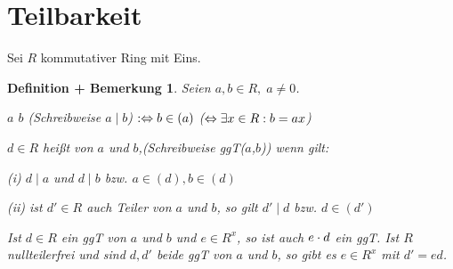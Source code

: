 \documentclass[a4paper,10pt,german]{scrbook}
\theoremstyle{saetze}
\theoremstyle{definitionen}
\newtheorem{DefBem}[Def]{Definition + Bemerkung}
\begin{document}
\section{Teilbarkeit}

Sei $R$ kommutativer Ring mit Eins.
\begin{DefBem}
Seien $a,b \in R,\; a\neq 0$.
\begin{enum}
\item $a$  $b$ (Schreibweise $a \mid b$) $:\Leftrightarrow b \in (a)$
($\Leftrightarrow \exists x \in R: b = ax$)

\item $d \in R$ heißt  von $a$ und
$b$,(Schreibweise ggT($a$,$b$)) wenn gilt:
    \begin{enum}
        \item[(i)] $d \mid a$ und $d \mid b$ bzw. $a \in (d),b\in (d)$
        \item[(ii)] ist $d' \in R$ auch Teiler von $a$ und $b$, so
        gilt $d' \mid d$ bzw. $d \in (d')$
    \end{enum}
\item Ist $d \in R$ ein ggT von $a$ und $b$ und $e \in R^x$, so ist
auch $e \cdot d$ ein ggT. Ist $R$ nullteilerfrei und
sind $d,d'$ beide ggT von $a$ und $b$, so gibt es $e \in R^x$ mit
$d' = ed$. 
\end{enum}
\end{DefBem}
\end{document}
